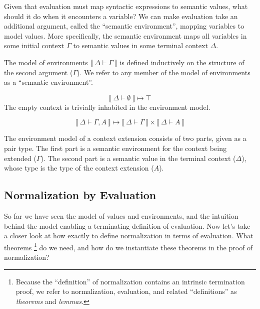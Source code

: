 \documentclass{llncs}
\newenvironment{mydefinition}[3]
{ \begin{mydefinition'}[#1] \label{def:#2}
  \hfill\break
  #3
}
{ \end{mydefinition'} }
\def\cross{\times}
\def\dfn{\mapsto}
\def\emp{\emptyset}
\newcommand{\els}[1]{\llbracket ~ #1 ~ \rrbracket}
\newcommand{\dtypm}[1]{\els{\Delta \vdash #1}}
\def\menv{\dmenv{\Gamma}}
\newcommand{\dmenv}[1]{\els{\Delta \vdash #1}}
\begin{document}
Given that evaluation must map syntactic expressions to semantic values,
what should it do when it encounters a variable? We can make
evaluation take an additional argument, called the
``semantic environment'', mapping variables to model values. More
specifically, the semantic environment maps all variables in
some initial context $\Gamma$ to semantic values in some terminal context
$\Delta$.

\begin{mydefinition}{Semantic Environments}{menv}
{
The model of environments $\menv$ is defined inductively on the structure
of the second argument ($\Gamma$). We refer to any member of the model
of environments as a ``semantic environment''.
}

\begin{mycase}
$$
\dmenv{\emp} \dfn \top
$$
The empty context is trivially inhabited in the environment model.
\end{mycase}

\begin{mycase}
$$
\dmenv{\Gamma, A} \dfn \dmenv{\Gamma} \cross \dtypm{A}
$$

The environment model of a context extension consists of two parts,
given as a pair type. The first part
is a semantic environment for the context being extended ($\Gamma$). The second part
is a semantic value in the terminal context ($\Delta$),
whose type is the type of the context extension ($A$).

\end{mycase}

\end{mydefinition}

\subsection{Normalization by Evaluation}

So far we have seen the model of values and environments, and the
intuition behind the model enabling a terminating definition of evaluation.
Now let's take a closer look at how exactly to define normalization in
terms of evaluation. What theorems 
\footnote{Because the ``definition'' of normalization contains an
intrinsic termination proof, we refer to normalization, evaluation, and
related ``definitions'' as \textit{theorems} and \textit{lemmas}.}
do we need, and how do we instantiate these theorems in the proof of
normalization?
\end{document}

